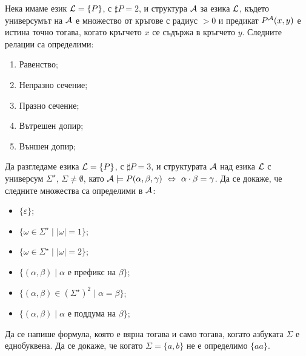 \begin{problem}
  Нека имаме език $\mathcal{L} = \{P\}$, с $\sharp P = 2$, и структура $\mathcal{A}$ за езика $\mathcal{L}$, където
  универсумът на $\mathcal{A}$ е множество от кръгове с радиус $> 0$ и предикат $P^{\mathcal{A}}(x,y)$ е истина точно тогава, когато кръгчето $x$ се съдържа в кръгчето $y$.
  Следните релации са определими:
  \begin{enumerate}[1)]
  \item
    Равенство;
  \item
    Непразно сечение;
  \item
    Празно сечение;
  \item
    Вътрешен допир;
  \item
    Външен допир;
  \end{enumerate}
\end{problem}

\begin{problem}
  Да разгледаме езика $\mathcal{L} = \{P\}$, с $\sharp P = 3$, и структурата $\mathcal{A}$ над езика $\mathcal{L}$ с универсум $\Sigma^\star$, $\Sigma \neq \emptyset$,
  като $\mathcal{A} \models P(\alpha,\beta,\gamma) \ \Leftrightarrow\  \alpha \cdot \beta = \gamma$.
  Да се докаже, че следните множества са определими в $\mathcal{A}$:
  \begin{itemize}
  \item
    $\{\varepsilon\}$;
  \item
    $\{\omega \in \Sigma^\star \mid |\omega| = 1\}$;
  \item
    $\{\omega \in \Sigma^\star \mid |\omega| = 2\}$;
  \item
    $\{(\alpha,\beta) \mid \alpha \text{ е префикс на }\beta\}$;
  \item
    $\{(\alpha,\beta) \in (\Sigma^\star)^2 \mid \alpha = \beta\}$;
  \item
    $\{(\alpha,\beta) \mid \alpha \text{ е поддума на }\beta\}$;
  \end{itemize}
  Да се напише формула, която е вярна тогава и само тогава, когато азбуката $\Sigma$ е еднобуквена.
  Да се докаже, че когато $\Sigma = \{a,b\}$ не е определимо $\{aa\}$.
\end{problem}



